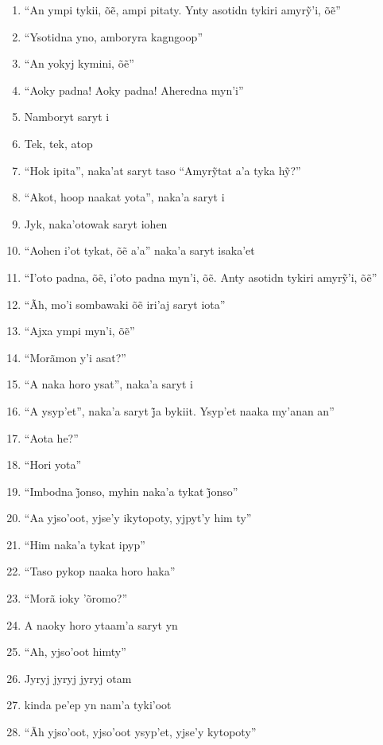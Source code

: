 \begin{enumerate}
 \item ``An ympi tykii, õẽ, ampi pitaty. Ynty asotidn tykiri amyrỹ’i, õẽ''
 \item ``Ysotidna yno, amboryra kagngoop''
 \item ``An yokyj kymini, õẽ''
 \item ``Aoky padna! Aoky padna! Aheredna myn'i''
 \begin{center}\end{center}
 \item Namboryt saryt i
 \item Tek, tek, atop
 \item ``Hok ipita'', naka’at saryt taso ``Amyrỹtat a’a tyka hỹ?''
 \item ``Akot, hoop naakat yota'', naka'a saryt i
 \item Jyk, naka'otowak saryt iohen
 \item ``Aohen i’ot tykat, õẽ a’a'' naka’a saryt isaka’et
 \item ``I’oto padna, õẽ, i’oto padna myn’i, õẽ. Anty asotidn tykiri amyrỹ’i, õẽ''
 \item ``Ãh, mo’i sombawaki õẽ iri’aj saryt iota''
 \item ``Ajxa ympi myn’i, õẽ''
 \item ``Morãmon y'i asat?''
 \item ``A naka horo ysat'', naka'a saryt i
 \item ``A ysyp’et'', naka’a saryt j̃a bykiit. Ysyp’et naaka my’anan an''
 \begin{center}\end{center}
 \item ``Aota he?''
 \item ``Hori yota''
 \item ``Imbodna j̃onso, myhin naka’a tykat j̃onso''
 \item ``Aa yjso'oot, yjse'y ikytopoty, yjpyt'y him ty''
 \item ``Him naka'a tykat ipyp''
 \item ``Taso pykop naaka horo haka''
 \item ``Morã ioky 'õromo?''
 \item A naoky horo ytaam'a saryt yn
 \item ``Ah, yjso'oot himty''
 \item Jyryj jyryj jyryj otam
 \item kinda pe'ep yn nam'a tyki'oot
 \item ``Ãh yjso'oot, yjso'oot ysyp'et, yjse'y kytopoty''
 \begin{center}\end{center}

\end{enumerate}
